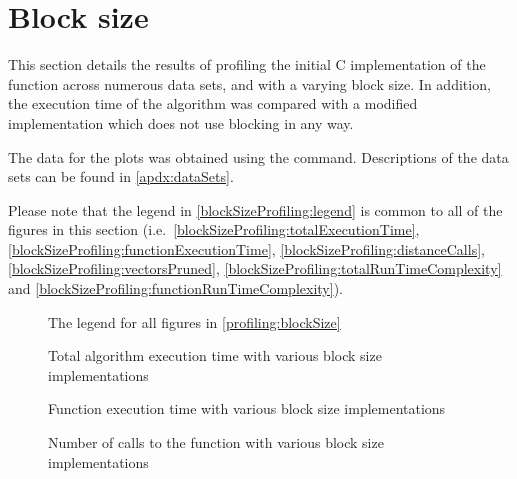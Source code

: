 \section{Block size}
\label{profiling:blockSize}
This section details the results of profiling the initial C implementation of
the  function across numerous data sets, and
with a varying block size. In addition, the execution time of the algorithm was
compared with a modified implementation which does not use blocking in any way.

The data for the plots was obtained using the 
 command. Descriptions of the data sets can be found in
\autoref{apdx:dataSets}.


Please note that the legend in \autoref{blockSizeProfiling:legend} is common to
all of the figures in this section (i.e.\
\autoref{blockSizeProfiling:totalExecutionTime},
\autoref{blockSizeProfiling:functionExecutionTime},
\autoref{blockSizeProfiling:distanceCalls},
\autoref{blockSizeProfiling:vectorsPruned},
\autoref{blockSizeProfiling:totalRunTimeComplexity} and
\autoref{blockSizeProfiling:functionRunTimeComplexity}).

\begin{figure}[H]
    \centering
    
    \caption[Block size profiling legend]
        {The legend for all figures in \autoref{profiling:blockSize}}
    \label{blockSizeProfiling:legend}
\end{figure}

\begin{figure}[H]
    \centering
    
    \caption{Total algorithm execution time with various block size
        implementations}
    \label{blockSizeProfiling:totalExecutionTime}
\end{figure}

\begin{figure}[H]
    \centering
    
    \caption{Function execution time with various block size implementations}
    \label{blockSizeProfiling:functionExecutionTime}
\end{figure}

\begin{figure}[H]
    \centering
    
    \caption{Number of calls to the  function with various
        block size implementations}
    \label{blockSizeProfiling:distanceCalls}
\end{figure}

